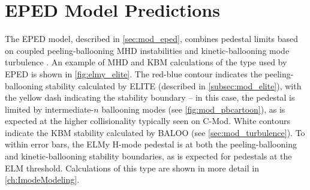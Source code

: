 
\section{EPED Model Predictions}\label{sec:elmy_eped}

The EPED model, described in \cref{sec:mod_eped}, combines pedestal limits based on coupled peeling-ballooning MHD instabilities \cite{Snyder2004,Wilson2002,Wilson2006} and kinetic-ballooning mode turbulence \cite{Snyder2001}.  An example of MHD and KBM calculations of the type used by EPED is shown in \cref{fig:elmy_elite}.  The red-blue contour indicates the peeling-ballooning stability calculated by ELITE (described in \cref{subsec:mod_elite}), with the yellow dash indicating the stability boundary -- in this case, the pedestal is limited by intermediate-$n$ ballooning modes (see \cref{fig:mod_pbcartoon}), as is expected at the higher collisionality typically seen on C-Mod.  White contours indicate the KBM stability calculated by BALOO (see \cref{sec:mod_turbulence}).  To within error bars, the ELMy H-mode pedestal is at both the peeling-ballooning and kinetic-ballooning stability boundaries, as is expected for pedestals at the ELM threshold.  Calculations of this type are shown in more detail in \cref{ch:ImodeModeling}.

\begin{figure}
 \pushtooutside
\end{figure}

